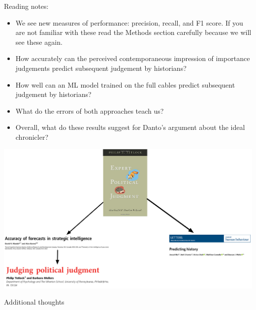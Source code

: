 \documentclass[aspectratio=169]{beamer}
\begin{document}
\begin{frame}

Reading notes:
\begin{itemize}
\item We see new measures of performance: precision, recall, and F1 score. If you are not familiar with these read the Methods section carefully because we will see these again.
\pause
\item How accurately can the perceived contemporaneous impression of importance judgements predict subsequent judgement by historians?
\pause
\item How well can an ML model trained on the full cables predict subsequent judgement by historians?
\pause
\item What do the errors of both approaches teach us?
\pause 
\item Overall, what do these results suggest for Danto's argument about the ideal chronicler?
\end{itemize}

\end{frame}
\begin{frame}

\begin{center}
\includegraphics[height=0.6\textheight]{figures/geopolitical_ideamap}
\end{center}

\end{frame}
\begin{frame}

\begin{center}
\LARGE{Additional thoughts}
\end{center}

\end{frame}
\end{document}
